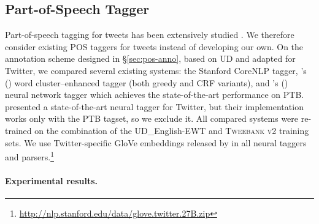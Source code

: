 \documentclass[11pt,a4paper]{article}
\newcommand{\citeposs}[2][]{\citeauthor{#2}'s (\citeyear[#1]{#2})}
\begin{document}
\subsection{Part-of-Speech Tagger}


Part-of-speech tagging for tweets has been extensively studied \cite{ritter-EtAl:2011:EMNLP,gimpel-EtAl:2011:ACL-HLT2011,derczynski-EtAl:2013:RANLP-2013,owoputi-EtAl:2013:NAACL-HLT,gui-EtAl:2017:EMNLP20172}. We therefore consider existing POS taggers for tweets instead of developing our own.
On the annotation scheme designed in \S\ref{sec:pos-anno}, based on UD and adapted for
Twitter, we compared several existing systems: the Stanford CoreNLP tagger, 
\citeposs{owoputi-EtAl:2013:NAACL-HLT} word cluster--enhanced tagger
(both greedy and CRF variants), and 
\citeposs{ma-hovy:2016:P16-1} neural network tagger 
which achieves the state-of-the-art performance on PTB.
 presented a state-of-the-art neural tagger for Twitter,
but their implementation works only with the PTB tagset, so we exclude
it. %
All compared systems were re-trained on the combination of the UD\_English-EWT and 
\textsc{Tweebank v2} training sets. We use Twitter-specific GloVe embeddings released by
\citet{pennington-socher-manning:2014:EMNLP2014} in all neural taggers
and parsers.\footnote{\url{http://nlp.stanford.edu/data/glove.twitter.27B.zip}}


\paragraph{Experimental results.}
\end{document}
